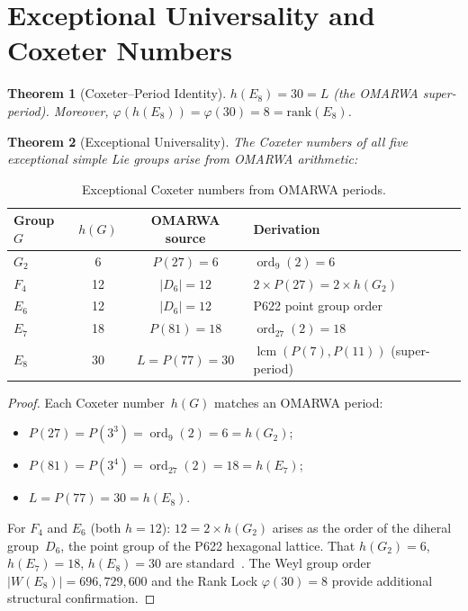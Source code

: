 \documentclass[11pt, a4paper]{article}
\theoremstyle{plain}
\newtheorem{theorem}{Theorem}[section]
\theoremstyle{definition}
\theoremstyle{remark}
\newcommand{\ord}{\operatorname{ord}}
\DeclareMathOperator{\lcm}{lcm}
\begin{document}
\section{Exceptional Universality and Coxeter
  Numbers}\label{sec:exceptional}

\begin{theorem}[Coxeter--Period Identity]\label{thm:coxeter}
$h(E_8) = 30 = L$ (the OMARWA super-period).
Moreover, $\varphi(h(E_8)) = \varphi(30) = 8 = \mathrm{rank}(E_8)$.
\end{theorem}

\begin{theorem}[Exceptional Universality]\label{thm:exceptional}
The Coxeter numbers of all five exceptional simple Lie groups arise from
OMARWA arithmetic:
\end{theorem}

\begin{table}[H]
\centering
\caption{Exceptional Coxeter numbers from OMARWA periods.}
\label{tab:exceptional}
\smallskip
\begin{tabular}{@{}lccl@{}}
\toprule
Group $G$ & $h(G)$ & OMARWA source & Derivation \\
\midrule
$G_2$ & 6  & $P(27) = 6$     & $\ord_9(2) = 6$ \\
$F_4$ & 12 & $|D_6| = 12$    & $2 \times P(27) = 2 \times h(G_2)$ \\
$E_6$ & 12 & $|D_6| = 12$    & P622 point group order \\
$E_7$ & 18 & $P(81) = 18$    & $\ord_{27}(2) = 18$ \\
$E_8$ & 30 & $L = P(77) = 30$ & $\lcm(P(7), P(11))$ (super-period) \\
\bottomrule
\end{tabular}
\end{table}

\begin{proof}
Each Coxeter number~$h(G)$ matches an OMARWA period:
\begin{itemize}
  \item $P(27) = P(3^3) = \ord_9(2) = 6 = h(G_2)$;
  \item $P(81) = P(3^4) = \ord_{27}(2) = 18 = h(E_7)$;
  \item $L = P(77) = 30 = h(E_8)$.
\end{itemize}
For $F_4$ and $E_6$ (both $h = 12$): $12 = 2 \times h(G_2)$ arises as
the order of the diheral group~$D_6$, the point group of the P622
hexagonal lattice. That $h(G_2) = 6$, $h(E_7) = 18$, $h(E_8) = 30$ are
standard~\cite{humphreys}. The Weyl group order
$|W(E_8)| = 696{,}729{,}600$ and the Rank Lock $\varphi(30) = 8$
provide additional structural confirmation.
\end{proof}
\end{document}
